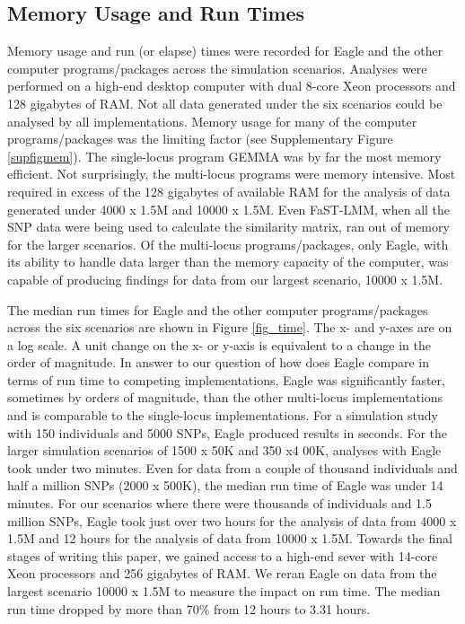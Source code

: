 \documentclass{article}
\begin{document}
\subsection{Memory Usage and Run Times}

Memory usage and run (or elapse) times were recorded for Eagle and the other computer programs/packages across the simulation scenarios. 
Analyses were performed on a high-end desktop computer with dual 8-core Xeon processors and 128 gigabytes of RAM. Not all data generated under the six scenarios could be analysed by all implementations. Memory usage 
for many of the computer programs/packages was the limiting factor (see Supplementary Figure \ref{supfigmem}).  The single-locus program GEMMA was by 
far the most memory efficient. Not surprisingly, the multi-locus programs were memory intensive. Most required in 
excess of the 128 gigabytes of available RAM for the analysis of data generated under 4000 x 1.5M and 10000 x 1.5M.  
Even FaST-LMM, when all the SNP data were being used to calculate the similarity matrix, ran out of memory for the larger scenarios.
Of the multi-locus programs/packages, only Eagle,  
with its ability to handle data larger than the memory capacity of the computer, was capable of producing findings 
for data from our largest scenario, 10000 x 1.5M. 



The median run times for Eagle and the other computer programs/packages across the six scenarios are shown in Figure \ref{fig_time}. 
The x- and y-axes are on a log scale.  A unit change on the x- or y-axis is equivalent to a change in the order of magnitude.  
In answer to our question of how does Eagle compare in terms of run time to competing implementations, 
Eagle was significantly faster, sometimes by orders of magnitude,  than the other multi-locus
 implementations and is comparable to the single-locus implementations. For a simulation study with 150 individuals and 
 5000 SNPs, Eagle produced results in seconds.  For the larger simulation scenarios of 1500 x  50K and 350 x4 00K, 
 analyses with Eagle took under two minutes. Even for data from a couple of thousand individuals and half a million 
 SNPs (2000 x 500K), the median run time of Eagle was under 14 minutes. For our scenarios where there 
 were thousands of individuals and 1.5 million SNPs, Eagle took just over two hours for the analysis of data from 
 4000 x 1.5M and  12 hours for the analysis of data from 10000 x 1.5M. 
 Towards the final stages of writing this paper, 
 we gained access to a high-end sever with 14-core Xeon processors and 256 gigabytes of RAM. We reran Eagle on data from the largest
  scenario 10000 x 1.5M to measure the impact on run time. The median run time dropped by more than 70\% 
  from 12 hours to 3.31 hours. 
 
\end{document}
